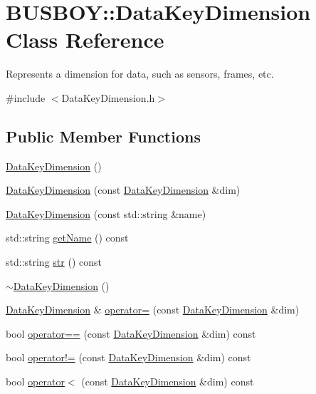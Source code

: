 \hypertarget{classBUSBOY_1_1DataKeyDimension}{
\section{BUSBOY::DataKeyDimension Class Reference}
\label{classBUSBOY_1_1DataKeyDimension}
}


Represents a dimension for data, such as sensors, frames, etc.  


{\ttfamily \#include $<$DataKeyDimension.h$>$}\subsection*{Public Member Functions}
\begin{DoxyCompactItemize}
\item 
\hyperlink{classBUSBOY_1_1DataKeyDimension_a9cf8d377d60c09b2443fc50cdb740ec9}{DataKeyDimension} ()
\item 
\hyperlink{classBUSBOY_1_1DataKeyDimension_acd624d40a9aac264a19f443183ced702}{DataKeyDimension} (const \hyperlink{classBUSBOY_1_1DataKeyDimension}{DataKeyDimension} \&dim)
\item 
\hyperlink{classBUSBOY_1_1DataKeyDimension_ac359a8884b6088878fa7669ecc9bbeb0}{DataKeyDimension} (const std::string \&name)
\item 
std::string \hyperlink{classBUSBOY_1_1DataKeyDimension_ae70e88293f4f5d7820c64cf28096d836}{getName} () const 
\item 
std::string \hyperlink{classBUSBOY_1_1DataKeyDimension_a0ad557b71ebb60017aed7c4bbe79aa4e}{str} () const 
\item 
\hyperlink{classBUSBOY_1_1DataKeyDimension_a2ee1d504f9520285e2b8ad17eaf1d955}{$\sim$DataKeyDimension} ()
\item 
\hyperlink{classBUSBOY_1_1DataKeyDimension}{DataKeyDimension} \& \hyperlink{classBUSBOY_1_1DataKeyDimension_a557e765ae27d18960aca52a00cc84e3a}{operator=} (const \hyperlink{classBUSBOY_1_1DataKeyDimension}{DataKeyDimension} \&dim)
\item 
bool \hyperlink{classBUSBOY_1_1DataKeyDimension_acdc0be3857a640397fbd86e432c8fef3}{operator==} (const \hyperlink{classBUSBOY_1_1DataKeyDimension}{DataKeyDimension} \&dim) const 
\item 
bool \hyperlink{classBUSBOY_1_1DataKeyDimension_a19bf1663b00cadf57cc91dd4ed634719}{operator!=} (const \hyperlink{classBUSBOY_1_1DataKeyDimension}{DataKeyDimension} \&dim) const 
\item 
bool \hyperlink{classBUSBOY_1_1DataKeyDimension_ae1772070bdb199c17250971749d99c53}{operator$<$} (const \hyperlink{classBUSBOY_1_1DataKeyDimension}{DataKeyDimension} \&dim) const 
\end{DoxyCompactItemize}



